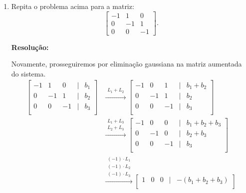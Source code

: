 \documentclass[leqno]{article}
\newenvironment{sol}
{
    \vspace{4mm}
    \noindent\textbf{Resolução:}
    \strut\newline
    \smallskip
    \hspace{-3.5mm}
}
{}
\begin{document}
\begin{enumerate}
\item Repita o problema acima para a matriz:
$$\begin{bmatrix}
-1 & 1 & 0\\
0 & -1 & 1\\
0 & 0 & -1
\end{bmatrix}.$$

\begin{sol}
    Novamente, prosseguiremos por eliminação gaussiana na matriz aumentada do sistema.
    \begin{align*}
    \begin{bmatrix}
        -1 & 1  & 0  & \mid & b_{ 1 } \\
        0  & -1 & 1  & \mid & b_{ 2 } \\
        0  & 0  & -1 & \mid & b_{ 3 } \\
    \end{bmatrix}
    & \xrightarrow{ 
        \begin{array}{l}
            L_{ 1 } + L_{ 2 }
        \end{array}
    }
    \begin{bmatrix}
        -1 & 0  & 1  & \mid & b_{ 1 } + b_{ 2 } \\
        0  & -1 & 1  & \mid & b_{ 2 } \\
        0  & 0  & -1 & \mid & b_{ 3 } \\
    \end{bmatrix} \\
    &\xrightarrow{ 
        \begin{array}{l}
            L_{ 1 } + L_{ 3 } \\
            L_{ 2 } + L_{ 3 }
        \end{array}
    }
    \begin{bmatrix}
        -1 & 0  & 0  & \mid & b_{ 1 } + b_{ 2 } + b_{ 3 } \\
        0  & -1 & 0  & \mid & b_{ 2 } + b_{ 3 } \\
        0  & 0  & -1 & \mid & b_{ 3 } \\
    \end{bmatrix} \\
    & \xrightarrow{ 
        \begin{array}{l}
            ( -1 ) \cdot L_{ 1 } \\
            ( -1 ) \cdot L_{ 2 } \\
            ( -1 ) \cdot L_{ 3 }
        \end{array}
    }
    \begin{bmatrix}
        1 & 0  & 0  & \mid & - ( b_{ 1 } + b_{ 2 } + b_{ 3 } ) \\

\end{bmatrix}
\end{align*}
\end{sol}
\end{enumerate}
\end{document}
